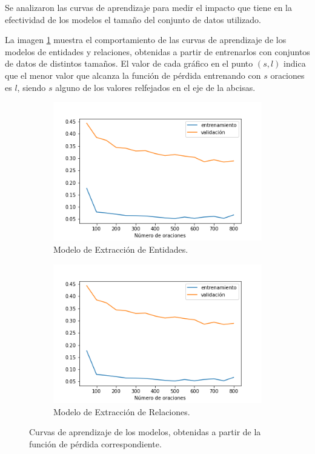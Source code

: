 Se analizaron las curvas de aprendizaje para medir el impacto que tiene en la efectividad de los modelos el tamaño del conjunto de datos utilizado.

La imagen \ref{fig:learning_curves} muestra el comportamiento de las curvas de aprendizaje de los modelos de entidades y relaciones, obtenidas a partir de entrenarlos con conjuntos de datos de distintos tamaños.
El valor de cada gráfico en el punto $(s,l)$ indica que el menor valor que alcanza la función de pérdida entrenando con $s$ oraciones es $l$, siendo $s$ alguno de los valores relfejados en el eje de la abcisas.

\begin{figure}[h!]
	\centering
	\begin{subfigure}{.5\linewidth}
		\centering
		\includegraphics[width=\linewidth]{Graphics/learning_curves_relations.png}
		\caption{Modelo de Extracción de Entidades.}
	\end{subfigure}%
	\begin{subfigure}{.5\linewidth}
		\centering
		\includegraphics[width=\linewidth]{Graphics/learning_curves_relations.png}
		\caption{Modelo de Extracción de Relaciones.}
	\end{subfigure}
	\caption{Curvas de aprendizaje de los modelos, obtenidas a partir de la función de pérdida correspondiente. } \label{fig:learning_curves}
\end{figure}

